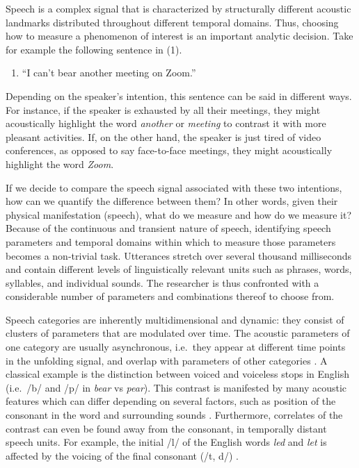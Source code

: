 \documentclass[Review,times,sageh]{sagej}
\providecommand{\tightlist}{\setlength{\itemsep}{0pt}\setlength{\parskip}{0pt}}
\begin{document}
Speech is a complex signal that is characterized by structurally different acoustic landmarks distributed throughout different temporal domains.
Thus, choosing how to measure a phenomenon of interest is an important analytic decision.
Take for example the following sentence in (1).

\vspace{1em}

\begin{enumerate}
\def\labelenumi{(\arabic{enumi})}
\tightlist
\item
  ``I can't bear another meeting on Zoom.''
  \vspace{1em}
\end{enumerate}

Depending on the speaker's intention, this sentence can be said in different ways.
For instance, if the speaker is exhausted by all their meetings, they might acoustically highlight the word \emph{another} or \emph{meeting} to contrast it with more pleasant activities.
If, on the other hand, the speaker is just tired of video conferences, as opposed to say face-to-face meetings, they might acoustically highlight the word \emph{Zoom}.

If we decide to compare the speech signal associated with these two intentions, how can we quantify the difference between them?
In other words, given their physical manifestation (speech), what do we measure and how do we measure it?
Because of the continuous and transient nature of speech, identifying speech parameters and temporal domains within which to measure those parameters becomes a non-trivial task.
Utterances stretch over several thousand milliseconds and contain different levels of linguistically relevant units such as phrases, words, syllables, and individual sounds.
The researcher is thus confronted with a considerable number of parameters and combinations thereof to choose from.

Speech categories are inherently multidimensional and dynamic: they consist of clusters of parameters that are modulated over time.
The acoustic parameters of one category are usually asynchronous, i.e.~they appear at different time points in the unfolding signal, and overlap with parameters of other categories \citep[e.g.][]{jongman2000acoustic, lisker1986voicing, summerfield1981articulatory, winter2014spoken}.
A classical example is the distinction between voiced and voiceless stops in English (i.e.~/b/ and /p/ in \emph{bear} vs \emph{pear}).
This contrast is manifested by many acoustic features which can differ depending on several factors, such as position of the consonant in the word and surrounding sounds \citep{lisker1977rapid}.
Furthermore, correlates of the contrast can even be found away from the consonant, in temporally distant speech units.
For example, the initial /l/ of the English words \emph{led} and \emph{let} is affected by the voicing of the final consonant (/t, d/) \citep{hawkins2004influence}.
\end{document}
